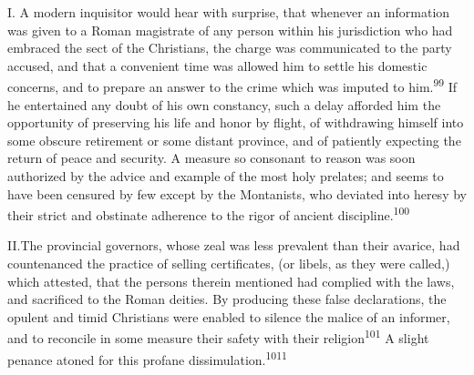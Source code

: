 
I. A modern inquisitor would hear with surprise, that whenever an
information was given to a Roman magistrate of any person within
his jurisdiction who had embraced the sect of the Christians, the
charge was communicated to the party accused, and that a
convenient time was allowed him to settle his domestic concerns,
and to prepare an answer to the crime which was imputed to him.\textsuperscript{99}
If he entertained any doubt of his own constancy, such a delay
afforded him the opportunity of preserving his life and honor by
flight, of withdrawing himself into some obscure retirement or
some distant province, and of patiently expecting the return of
peace and security. A measure so consonant to reason was soon
authorized by the advice and example of the most holy prelates;
and seems to have been censured by few except by the Montanists,
who deviated into heresy by their strict and obstinate adherence
to the rigor of ancient discipline.\textsuperscript{100}

II.The provincial governors, whose zeal was less prevalent than
their avarice, had countenanced the practice of selling
certificates, (or libels, as they were called,) which attested,
that the persons therein mentioned had complied with the laws,
and sacrificed to the Roman deities. By producing these false
declarations, the opulent and timid Christians were enabled to
silence the malice of an informer, and to reconcile in some
measure their safety with their religion\textsuperscript{101} A slight penance
atoned for this profane dissimulation.\textsuperscript{1011}

